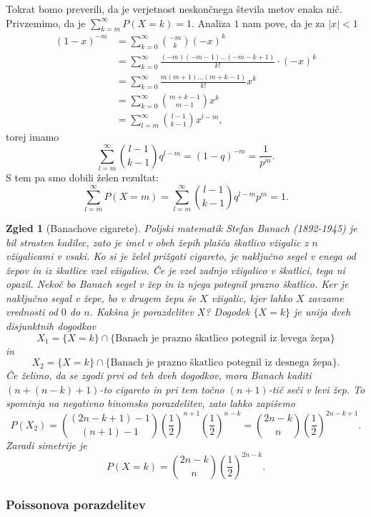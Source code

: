 \documentclass[10pt, a4paper]{article}
\newtheorem{zgled}[izr]{Zgled}
\begin{document}
Tokrat bomo preverili, da je verjetnost neskončnega števila metov enaka nič.
Privzemimo, da je $\sum_{k = m} ^\infty P(X = k) = 1$.
Analiza $1$ nam pove, da je za $|x| < 1$
\begin{align*}
  (1 - x)^{-m} &= \sum_{k = 0} ^\infty \binom{-m}{k} (-x)^k\\
  &= \sum_{k = 0} ^\infty \frac{(-m) (-m - 1) \dots (- m - k + 1)}{k!} \cdot (-x)^k\\
  &= \sum_{k = 0} ^\infty \frac{m (m + 1) \dots (m + k - 1)}{k!} x^k\\
  &= \sum_{k = 0} ^\infty \binom{m + k - 1}{m - 1} x^k\\
  &= \sum_{l = m} ^\infty \binom{l - 1}{k - 1} x^{l - m},
\end{align*}
torej imamo 
$$\sum_{l = m} ^\infty \binom{l - 1}{k - 1} q^{l - m}= (1 - q)^{-m} = \frac{1}{p^m}.$$
S tem pa smo dobili želen rezultat:
$$\sum_{l = m}^\infty P(X = m) = \sum_{l = m} ^\infty \binom{l - 1}{k - 1} q^{l - m} p^m = 1.$$

\begin{zgled}[Banachove cigarete]
  Poljski matematik Stefan Banach (1892-1945) je bil strasten kadilec,
  zato je imel v obeh žepih plašča škatlico vžigalic z $n$ vžigalicami v vsaki.
  Ko si je želel prižgati cigareto, je naključno segel v enega od žepov 
  in iz škatlice vzel vžigalico. Če je vzel zadnjo vžigalico v škatlici, tega ni opazil.
  Nekoč bo Banach segel v žep in iz njega potegnil prazno škatlico.
  Ker je naključno segal v žepe, bo v drugem žepu še $X$ vžigalic, 
  kjer lahko $X$ zavzame vrednosti od $0$ do $n$. Kakšna je porazdelitev $X$?
  Dogodek $\{X = k\}$ je unija dveh disjunktnih dogodkov 
  $$X_1 = \{X = k\} \cap \{\text{Banach je prazno škatlico potegnil iz levega žepa}\}$$
  in 
  $$X_2 = \{X = k\} \cap \{\text{Banach je prazno škatlico potegnil iz desnega žepa}\}.$$
  Če želimo, da se zgodi prvi od teh dveh dogodkov, mora Banach kaditi $(n + (n - k) + 1)$-to 
  cigareto in pri tem točno $(n + 1)$-tič seči v levi žep.
  To spominja na negativno binomsko porazdelitev, zato lahko zapišemo 
  $$P(X_2) = \binom{(2n - k + 1) - 1}{(n + 1) - 1} \left(\frac{1}{2}\right)^{n + 1} \left(\frac{1}{2}\right)^{n - k} = \binom{2n - k}{n} \left(\frac{1}{2}\right)^{2n - k + 1}.$$
  Zaradi simetrije je 
  $$P(X = k) = \binom{2n - k}{n} \left(\frac{1}{2}\right)^{2n - k}.$$
\end{zgled}

\subsubsection*{Poissonova porazdelitev}
\end{document}
